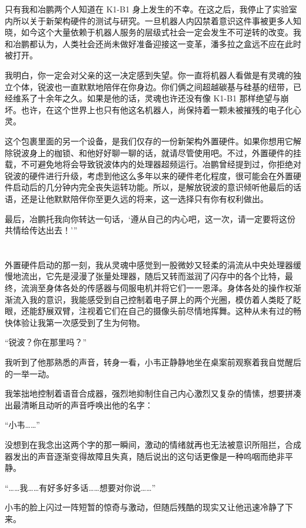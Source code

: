 \documentclass[punct=kaiming, zihao=5, openany, fontset=sikou]{ctexbook}
\begin{document}
只有我和冶鹏两个人知道在 K1-B1 身上发生的不幸。在这之后，我停止了实验室内所以关于新架构硬件的测试与研究。一旦机器人内囚禁着意识这件事被更多人知晓，如今这个大量依赖于机器人服务的层级式社会一定会发生不可逆转的改变。我和冶鹏都认为，人类社会还尚未做好准备迎接这一变革，潘多拉之盒远不应在此时被打开。

我明白，你一定会对父亲的这一决定感到失望。你一直将机器人看做是有灵魂的独立个体，锐波也一直默默地陪伴在你身边。你们俩之间超越碳基与硅基的纽带，已经维系了十余年之久。如果是他的话，灵魂也许还没有像 K1-B1 那样绝望与崩坏。也许，在这个世界上也只有他这名机器人，尚保持着一颗未被摧残的电子化心灵。

这个包裹里面的另一个设备，是我们仅存的一份新架构外置硬件。如果你想用它解除锐波身上的枷锁、和他好好聊一聊的话，就请尽管使用吧。不过，外置硬件的挂载，不可避免地将会导致锐波体内的处理器超频运行。冶鹏曾经提到过，你拒绝对锐波的硬件进行升级，考虑到他这么多年以来的硬件老化程度，很可能会在外置硬件启动后的几分钟内完全丧失运转功能。所以，是解放锐波的意识倾听他最后的话语，还是让他默默陪伴你至更久远的将来，这一选择只有你有权利做出。

最后，冶鹏托我向你转达一句话，‘遵从自己的内心吧，这一次，请一定要将这份共情给传达出去！’”

\section{}

外置硬件启动的那一刻，我从灵魂中感觉到一股微妙又轻柔的涓流从中央处理器缓慢地流出，它先是浸漫了张量处理器，随后又转而滋润了闪存中的各个比特，最终，流淌至身体各处的传感器与伺服电机并将它们一一恩泽。身体各处的操作权渐渐流入我的意识，我能感受到自己控制着电子屏上的两个光圈，模仿着人类眨了眨眼，还能舒展双臂，注视着它们在自己的摄像头前尽情地挥舞。这种从未有过的畅快体验让我第一次感受到了生为何物。

“锐波？你在那里吗？”

我听到了他那熟悉的声音，转身一看，小韦正静静地坐在桌案前观察着我自觉醒后的一举一动。

我笨拙地控制着语音合成器，强烈地抑制住自己内心激烈又复杂的情愫，想要拼凑出最清晰且动听的声音呼唤出他的名字：

“小韦……”

没想到在我念出这两个字的那一瞬间，激动的情绪就再也无法被意识所阻拦，合成器发出的声音逐渐变得故障且失真，随后说出的这句话更像是一种呜咽而绝非平静。

“……我……有好多好多话……想要对你说……”

小韦的脸上闪过一阵短暂的惊奇与激动，但随后残酷的现实又让他迅速冷静了下来。
\end{document}
